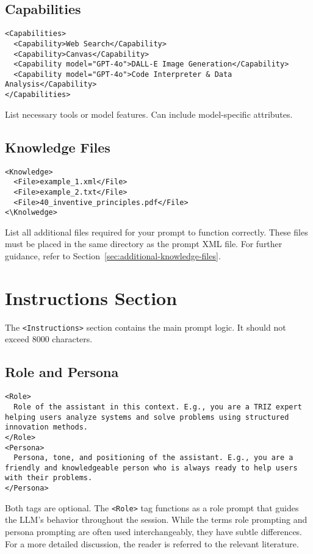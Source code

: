 \documentclass[a4paper,11pt]{refart}
\begin{document}
\subsection{Capabilities}
\begin{lstlisting}
<Capabilities>
  <Capability>Web Search</Capability>
  <Capability>Canvas</Capability>
  <Capability model="GPT-4o">DALL-E Image Generation</Capability>
  <Capability model="GPT-4o">Code Interpreter & Data Analysis</Capability>
</Capabilities>
\end{lstlisting}
List necessary tools or model features. Can include model-specific attributes.

\subsection{Knowledge Files}
\begin{lstlisting}
<Knowledge>
  <File>example_1.xml</File>
  <File>example_2.txt</File>
  <File>40_inventive_principles.pdf</File>
<\Knolwedge>
\end{lstlisting}
List all additional files required for your prompt to function correctly. These files must be placed in the same directory as the prompt XML file. For further guidance, refer to Section~\ref{sec:additional-knowledge-files}.

\section{Instructions Section}
The \lstinline!<Instructions>! section contains the main prompt logic. It should not exceed 8000 characters.

\subsection{Role and Persona}
\begin{lstlisting}
<Role>
  Role of the assistant in this context. E.g., you are a TRIZ expert helping users analyze systems and solve problems using structured innovation methods.
</Role>
<Persona>
  Persona, tone, and positioning of the assistant. E.g., you are a friendly and knowledgeable person who is always ready to help users with their problems.
</Persona>
\end{lstlisting}
Both tags are optional. The \lstinline!<Role>! tag functions as a role prompt that guides the LLM's behavior throughout the session. While the terms role prompting and persona prompting are often used interchangeably, they have subtle differences. For a more detailed discussion, the reader is referred to the relevant literature. \cite{zotero-item-1637,debnath2025,park2023,wei2023}
\end{document}
